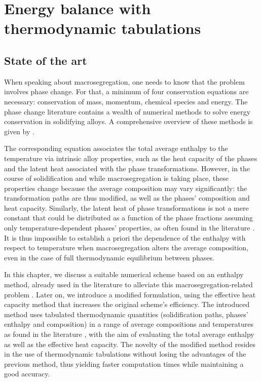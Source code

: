 \chapter{Energy balance with thermodynamic tabulations}
\begin{nolinkcolors} 
\minitoc
\end{nolinkcolors}
\newpage
%
%
\section{State of the art}
When speaking about macrosegregation, one needs to know that the problem involves phase change.
For that, a minimum of four conservation equations are necessary:
conservation  of  mass, momentum,  chemical  species and  energy. The  phase  change
literature  contains a  wealth of numerical methods to solve energy conservation
in solidifying alloys. A comprehensive overview of these methods is given by \citet{swaminathan._enthalpy_1993}.

The corresponding equation associates the total average enthalpy to the
temperature  via  intrinsic  alloy  properties, such  as the heat  capacity of  the
phases and the latent  heat associated with the phase transformations. However, in the course
of solidification and while macrosegregation is taking place, these  properties change because the average
composition may  vary  significantly: the  transformation paths are thus modified, as well as
the phases' composition and heat capacity. Similarly, the latent heat of phase  transformations
is not a mere constant that could be distributed as a function of the phase fractions
assuming only temperature-dependent phases' properties, as often found in the literature \citep{bellet_call_2009}.
It is thus impossible to establish a priori the dependence of the enthalpy with respect
to temperature when macrosegregation alters the average composition, even in the case of full thermodynamic equilibrium
between phases. 

In this chapter, we discuss a suitable numerical scheme based on an enthalpy method,
already used in the literature  to  alleviate this macrosegregation-related problem \citep{swaminathan._enthalpy_1993,
carozzani_direct_2013}. Later on, we introduce a modified formulation, using the effective heat capacity method that 
increases the original scheme's efficiency. 
The introduced method uses tabulated thermodynamic quantities (solidification paths, phases' enthalpy  and composition) 
in a range of average compositions and temperatures as found in the literature 
\citep{dore_modelling_2000,thuinet_prediction_2004,du_modeling_2007}, 
with the aim of evaluating the total average enthalpy as well as the effective heat capacity. 
The novelty of the modified method resides in the use of thermodynamic tabulations without losing 
the advantages of the previous method, thus yielding faster computation times while maintaining a 
good accuracy.
%
%
